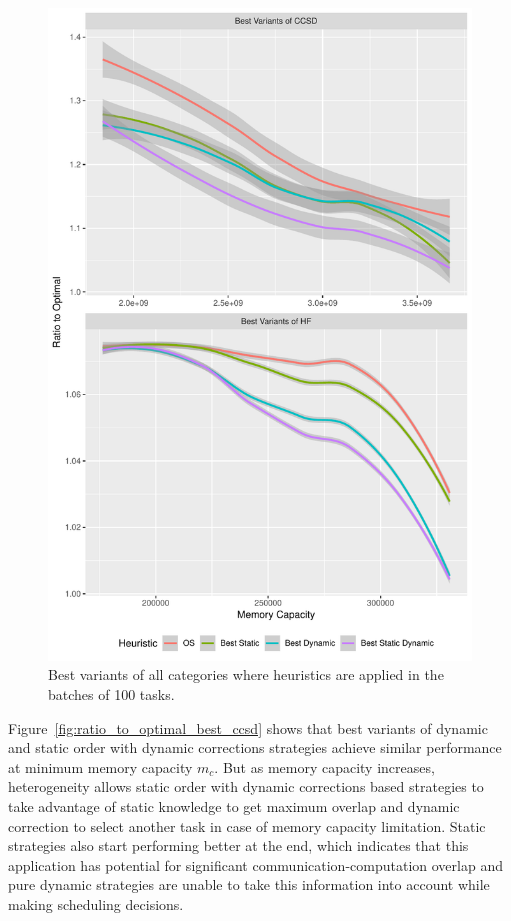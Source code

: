 \documentclass[runningheads]{llncs} %
\begin{document}
			\begin{figure}[!ht]
		\begin{center}
			\includegraphics[scale=0.65]{./ratio_to_optimal_batch-best.pdf}
			\caption{Best variants of all categories where heuristics are applied in the batches of 100 tasks.}
			\label{fig:best_variants_batch}
		\end{center}
		\end{figure}
	Figure~\ref{fig:ratio_to_optimal_best_ccsd} shows that best variants of dynamic and static order with dynamic corrections strategies achieve similar performance at minimum memory capacity $m_c$. But as memory capacity increases, heterogeneity allows static order with dynamic corrections based strategies to take advantage of static knowledge to get maximum overlap and dynamic correction to select another task in case of memory capacity limitation. Static strategies also start performing better at the end, which indicates that this application has potential for significant communication-computation overlap and pure dynamic strategies are unable to take this information into account while making scheduling decisions.
	
\end{document}
